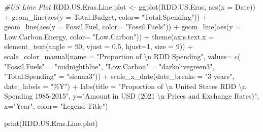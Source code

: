 \documentclass[
  12pt,
]{article}
\newenvironment{Shaded}{\begin{snugshade}}{\end{snugshade}}
\newcommand{\AttributeTok}[1]{\textcolor[rgb]{0.77,0.63,0.00}{#1}}
\newcommand{\CommentTok}[1]{\textcolor[rgb]{0.56,0.35,0.01}{\textit{#1}}}
\newcommand{\DecValTok}[1]{\textcolor[rgb]{0.00,0.00,0.81}{#1}}
\newcommand{\FloatTok}[1]{\textcolor[rgb]{0.00,0.00,0.81}{#1}}
\newcommand{\FunctionTok}[1]{\textcolor[rgb]{0.00,0.00,0.00}{#1}}
\newcommand{\NormalTok}[1]{#1}
\newcommand{\OtherTok}[1]{\textcolor[rgb]{0.56,0.35,0.01}{#1}}
\newcommand{\SpecialCharTok}[1]{\textcolor[rgb]{0.00,0.00,0.00}{#1}}
\newcommand{\StringTok}[1]{\textcolor[rgb]{0.31,0.60,0.02}{#1}}
\begin{document}
\begin{Shaded}
\begin{Highlighting}[]
\CommentTok{\#US Line Plot}
\NormalTok{RDD.US.Eras.Line.plot }\OtherTok{\textless{}{-}} \FunctionTok{ggplot}\NormalTok{(RDD.US.Eras, }\FunctionTok{aes}\NormalTok{(}\AttributeTok{x =}\NormalTok{ Date)) }\SpecialCharTok{+}
  \FunctionTok{geom\_line}\NormalTok{(}\FunctionTok{aes}\NormalTok{(}\AttributeTok{y =}\NormalTok{ Total.Budget, }\AttributeTok{color=} \StringTok{"Total.Spending"}\NormalTok{)) }\SpecialCharTok{+}
  \FunctionTok{geom\_line}\NormalTok{(}\FunctionTok{aes}\NormalTok{(}\AttributeTok{y =}\NormalTok{ Fossil.Fuel, }\AttributeTok{color=} \StringTok{"Fossil.Fuels"}\NormalTok{)) }\SpecialCharTok{+}
  \FunctionTok{geom\_line}\NormalTok{(}\FunctionTok{aes}\NormalTok{(}\AttributeTok{y =}\NormalTok{ Low.Carbon.Energy, }\AttributeTok{color=} \StringTok{"Low.Carbon"}\NormalTok{)) }\SpecialCharTok{+}
  \FunctionTok{theme}\NormalTok{(}\AttributeTok{axis.text.x =} \FunctionTok{element\_text}\NormalTok{(}\AttributeTok{angle =} \DecValTok{90}\NormalTok{, }\AttributeTok{vjust =} \FloatTok{0.5}\NormalTok{, }\AttributeTok{hjust=}\DecValTok{1}\NormalTok{, }\AttributeTok{size =} \DecValTok{9}\NormalTok{)) }\SpecialCharTok{+}
  \FunctionTok{scale\_color\_manual}\NormalTok{(}\AttributeTok{name =} \StringTok{"Proportion of }\SpecialCharTok{\textbackslash{}n}\StringTok{ RDD Spending"}\NormalTok{, }\AttributeTok{values=} \FunctionTok{c}\NormalTok{(}
    \StringTok{"Fossil.Fuels"} \OtherTok{=} \StringTok{"midnightblue"}\NormalTok{, }
    \StringTok{"Low.Carbon"} \OtherTok{=} \StringTok{"darkolivegreen3"}\NormalTok{, }
    \StringTok{"Total.Spending"} \OtherTok{=} \StringTok{"sienna3"}\NormalTok{)) }\SpecialCharTok{+}
  \FunctionTok{scale\_x\_date}\NormalTok{(}\AttributeTok{date\_breaks =} \StringTok{"3 years"}\NormalTok{, }\AttributeTok{date\_labels =} \StringTok{"\%Y"}\NormalTok{) }\SpecialCharTok{+}
  \FunctionTok{labs}\NormalTok{(}\AttributeTok{title =} \StringTok{"Proportion of }\SpecialCharTok{\textbackslash{}n}\StringTok{ United States RDD }\SpecialCharTok{\textbackslash{}n}\StringTok{ Spending 1985{-}2015"}\NormalTok{,}
       \AttributeTok{y=}\StringTok{"Amount in USD (2021 }\SpecialCharTok{\textbackslash{}n}\StringTok{ Prices and Exchange Rates)"}\NormalTok{,}
       \AttributeTok{x=}\StringTok{"Year"}\NormalTok{,}
       \AttributeTok{color=} \StringTok{"Legend Title"}\NormalTok{)}

\FunctionTok{print}\NormalTok{(RDD.US.Eras.Line.plot)}
\end{Highlighting}
\end{Shaded}
\end{document}
